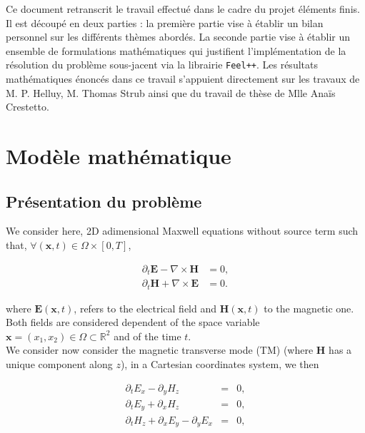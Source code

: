 \documentclass[a4paper,oneside,10pt]{report}
\begin{document}
\def\chaptername{Chapter} 
 
\pagestyle{plain}


\tableofcontents


\newpage
\null
\vfill
Ce document retranscrit le travail effectué dans le cadre du projet éléments finis. Il est découpé en deux parties : la première partie vise à établir un bilan personnel sur les différents thèmes abordés. La seconde partie vise à établir un ensemble de formulations mathématiques qui justifient l'implémentation de la résolution du problème sous-jacent via la librairie \texttt{Feel++}. Les résultats mathématiques énoncés dans ce travail s'appuient directement sur les travaux de M. P. Helluy, M. Thomas Strub ainsi que du travail de thèse de Mlle Anaïs Crestetto. 
\vfill

\chapter{Modèle mathématique}
\section{Présentation du problème}
We consider here, 2D adimensional Maxwell equations without source term such that, $\forall (\mathbf{x},t) \in \Omega \times [0,T]$,


\begin{equation}
\begin{aligned}
\label{eq:1}
\partial_t \mathbf{E} - \nabla \times \mathbf{H} &= 0,\\
\partial_t \mathbf{H} + \nabla \times \mathbf{E} &= 0.
\end{aligned}
\end{equation}

where $\mathbf{E}(\mathbf{x},t)$, refers to the electrical field and $\mathbf{H}(\mathbf{x},t)$ to the magnetic one. Both fields are considered dependent of the space variable  $\mathbf{x}=(x_1,x_2)\in \Omega \subset \mathbb{R}^2$ and of the time $t$.\\


We consider now consider the magnetic transverse mode (TM) (where  $\mathbf{H}$ has a unique component along $z$), in a Cartesian coordinates system, we then 

\begin{eqnarray}
\partial_t E_x - \partial_y H_z  &=& 0, \label{eq:2a}\\
\partial_t E_y + \partial_x H_z &=& 0, \label{eq:2b}\\
\partial_t H_z + \partial_x E_y - \partial_y E_x &=& 0, \label{eq:2c}
\end{eqnarray}
\end{document}
